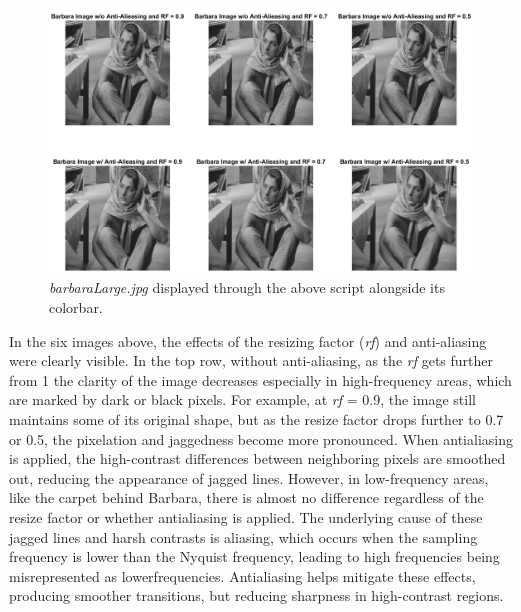 \documentclass[a4paper, 10pt]{article}
\begin{document}
\begin{figure}[H]
  \centering
  \includegraphics[width=13.5cm]{images/q4_c.png}
  \caption{\textit{barbaraLarge.jpg} displayed through the above script alongside its colorbar.}
\end{figure}
In the six images above, the effects of the resizing factor (\textit{rf}) and anti-aliasing were clearly visible. In 
the top row, without anti-aliasing, as the \textit{rf} gets further from 1 the clarity of the image decreases especially
in high-frequency areas, which are marked by dark or black pixels. For example, at \textit{rf} = 0.9, the image still 
maintains some of its original shape, but as the resize factor drops further to 0.7 or 0.5, the pixelation and jaggedness
become more pronounced. When antialiasing is applied, the high-contrast differences between neighboring pixels are 
smoothed out, reducing the appearance of jagged lines. However, in low-frequency areas, like the carpet behind Barbara,
there is almost no difference regardless of the resize factor or whether antialiasing is applied. The underlying cause
of these jagged lines and harsh contrasts is aliasing, which occurs when the sampling frequency is lower than the Nyquist
frequency, leading to high frequencies being misrepresented as lowerfrequencies. Antialiasing helps mitigate these
effects, producing smoother transitions, but reducing sharpness in high-contrast regions.

\hfill
\end{document}

